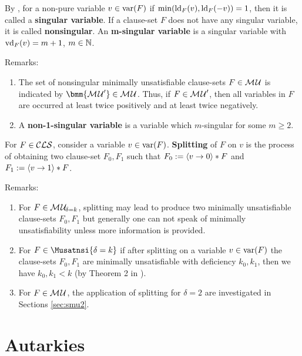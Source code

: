 \documentclass{report}
\begin{document}
\begin{defi}\label{def:singvar}
By \cite{KullmannZhao2012ConfluenceJ}, for a non-pure variable $v \in \operatorname{var}(F)$ if $\min(\operatorname{ld}_F(v) ,\operatorname{ld}_F(-v))=1$, then it is called a \textbf{singular variable}. If a clause-set $F$ does not have any singular variable, it is called \textbf{nonsingular}. An \textbf{m-singular variable} is a singular variable with $\operatorname{vd}_F(v)=m+1$, $m \in \mathbb{N}$.
\end{defi}
Remarks:
  \begin{enumerate}
  \item The set of nonsingular minimally unsatisfiable clause-sets $F \in \mathcal{M\hspace{0.8pt}U}$ is indicated by $\bmm{\Musat'} \in \Musat$. Thus, if $F \in \mathcal{M\hspace{0.8pt}U}'$, then all variables in $F$ are occurred at least twice positively and at least twice negatively.
  \item A \textbf{non-1-singular variable} is a variable which $m$-singular for some $m \ge 2$.
   \end{enumerate}
 
\begin{defi}\label{def:splitting}
For $F \in \mathcal{CLS}$, consider a variable $v \in \operatorname{var}(F)$. \textbf{Splitting} of $F$ on $v$ is the process of obtaining two clause-set $F_0,F_1$ such that  $F_0:=\langle v \rightarrow 0 \rangle * F$ and $F_1:=\langle v \rightarrow 1 \rangle * F$.
\end{defi}
Remarks:
  \begin{enumerate}
  \item For $F \in\mathcal{M\hspace{0.8pt}U}_{\!\delta=k}$, splitting may lead to produce two minimally unsatisfiable clause-sets $F_0,F_1$ but generally one can not speak of minimally unsatisfiability unless more information is provided. 
  \item For $F \in\Musatnsi{\delta=k}$ if after splitting on a variable $v \in \operatorname{var}(F)$ the clause-sets $F_0,F_1$ are minimally unsatisfiable with deficiency $k_0, k_1$, then we have $k_0, k_1 < k$ (by Theorem 2 in \cite{KleineBuening2000SubclassesMU}).
  \item For $F \in \mathcal{M\hspace{0.8pt}U}$, the application of splitting for $\delta=2$ are investigated in Sections \ref{sec:smu2}.
  \end{enumerate}
\section{Autarkies}
\label{sec:autrk}
\end{document}
